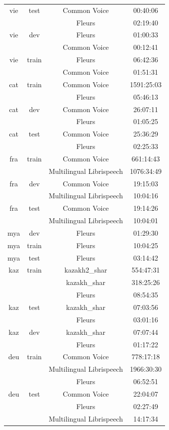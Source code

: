 \begin{longtable}{cccc}
vie & test & Common Voice & 00:40:06 \\ 
 & & Fleurs & 02:19:40 \\ 
vie & dev & Fleurs & 01:00:33 \\ 
 & & Common Voice & 00:12:41 \\ 
vie & train & Fleurs & 06:42:36 \\ 
 & & Common Voice & 01:51:31 \\ \midrule
cat & train & Common Voice & 1591:25:03 \\ 
 & & Fleurs & 05:46:13 \\ 
cat & dev & Common Voice & 26:07:11 \\ 
 & & Fleurs & 01:05:25 \\ 
cat & test & Common Voice & 25:36:29 \\ 
 & & Fleurs & 02:25:33 \\ \midrule
fra & train & Common Voice & 661:14:43 \\ 
 & & Multilingual Librispeech & 1076:34:49 \\ 
fra & dev & Common Voice & 19:15:03 \\ 
 & & Multilingual Librispeech & 10:04:16 \\ 
fra & test & Common Voice & 19:14:26 \\ 
 & & Multilingual Librispeech & 10:04:01 \\ \midrule
mya & dev & Fleurs & 01:29:30 \\ 
mya & train & Fleurs & 10:04:25 \\ 
mya & test & Fleurs & 03:14:42 \\ \midrule
kaz & train & kazakh2_shar & 554:47:31 \\ 
 & & kazakh_shar & 318:25:26 \\ 
 & & Fleurs & 08:54:35 \\ 
kaz & test & kazakh_shar & 07:03:56 \\ 
 & & Fleurs & 03:01:16 \\ 
kaz & dev & kazakh_shar & 07:07:44 \\ 
 & & Fleurs & 01:17:22 \\ \midrule
deu & train & Common Voice & 778:17:18 \\ 
 & & Multilingual Librispeech & 1966:30:30 \\ 
 & & Fleurs & 06:52:51 \\ 
deu & test & Common Voice & 22:04:07 \\ 
 & & Fleurs & 02:27:49 \\ 
 & & Multilingual Librispeech & 14:17:34 \\ 

\end{longtable}
